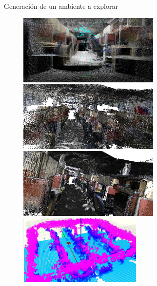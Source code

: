 \documentclass[24pt,aspectratio=169]{beamer}
\begin{document}
\begin{frame}{Generación de un ambiente a explorar}
  \begin{figure}[ht!]
    \centering
    \begin{minipage}{0.48\textwidth}
      \centering
      \includegraphics[width=\linewidth,height=3.5cm]{ROS_MAP2} %
    \end{minipage}\hfill
    \begin{minipage}{0.48\textwidth}
      \centering
      \includegraphics[width=\linewidth,height=3.5cm]{ROS_MAP3} %
    \end{minipage}
    \vspace{-0.2cm} %
    \begin{minipage}{0.48\textwidth}
      \centering
      \includegraphics[width=\linewidth,height=3.5cm]{ROS_MAP4} %
    \end{minipage}\hfill
    \begin{minipage}{0.48\textwidth}
      \centering
      \includegraphics[width=\linewidth,height=3.5cm]{ROS_MAP6} %
    \end{minipage}
  \end{figure}
\end{frame}
\end{document}
